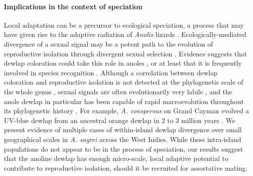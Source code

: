 \paragraph{Implications in the context of speciation} Local adaptation can be a precursor to ecological speciation, a process that may have given rise to the adaptive radiation of \textit{Anolis} lizards \citep{Harmon2003, Gavrilets2009}. Ecologically-mediated divergence of a sexual signal may be a potent path to the evolution of reproductive isolation through divergent sexual selection \citep{Reynolds2007, Servedio2011}. Evidence suggests that dewlap coloration could take this role in anoles \citep{Ng2011, Lambert2013, Geneva2015, Ng2017}, or at least that it is frequently involved in species recognition \citep{Williams1969, Williams1977, Losos1985, Macedonia1994, Fleishman2000, Macedonia2013, Ingram2016, Baeckens2018}. Although a correlation between dewlap coloration and reproductive isolation is not detected at the phylogenetic scale of the whole genus \citep{Nicholson2007, Harrison2012, Ingram2016}, sexual signals are often evolutionarily very labile \citep{Kraaijeveld2011}, and the anole dewlap in particular has been capable of rapid macroevolution throughout its phylogenetic history \citep{Nicholson2007}. For example, \textit{A. conspersus} on Grand Cayman evolved a UV-blue dewlap from an ancestral orange dewlap in 2 to 3 million years \citep{Macedonia2001}. We present evidence of multiple cases of within-island dewlap divergence over small geographical scales in \textit{A. sagrei} across the West Indies. While these intra-island populations do not appear to be in the process of speciation, our results suggest that the anoline dewlap has enough micro-scale, local adaptive potential to contribute to reproductive isolation, should it be recruited for assortative mating.